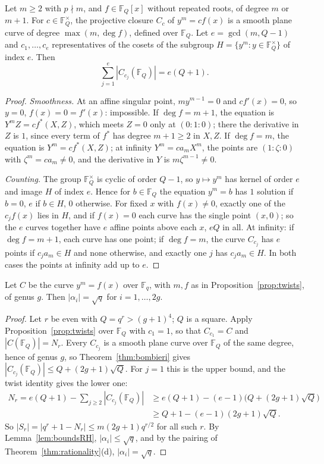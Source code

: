\begin{proposition}[twists]\label{prop:twists}
Let $m\ge2$ with $p\nmid m$, and $f\in\mathbb F_Q[x]$ without repeated roots, of degree $m$ or $m+1$. For $c\in\mathbb F_Q^\times$, the projective closure $C_c$ of
$y^m=cf(x)$ is a smooth plane curve of degree $\max(m,\deg f)$, defined over $\mathbb F_Q$. Let $e=\gcd(m,Q-1)$ and $c_1,\dots,c_e$ representatives of the cosets
of the subgroup $H=\{y^m:y\in\mathbb F_Q^\times\}$ of index $e$. Then
\[
\sum_{j=1}^e|C_{c_j}(\mathbb F_Q)|=e(Q+1).
\]
\end{proposition}
\begin{proof}
\emph{Smoothness.} At an affine singular point, $my^{m-1}=0$ and $cf'(x)=0$, so $y=0$, $f(x)=0=f'(x)$: impossible. If $\deg f=m+1$, the equation is
$Y^mZ=cf^*(X,Z)$, which meets $Z=0$ only at $(0:1:0)$; there the derivative in $Z$ is $1$, since every term of $f^*$ has degree $m+1\ge2$ in $X,Z$. If
$\deg f=m$, the equation is $Y^m=cf^*(X,Z)$; at infinity $Y^m=ca_mX^m$, the points are $(1:\zeta:0)$ with $\zeta^m=ca_m\ne0$, and the derivative in $Y$ is
$m\zeta^{m-1}\ne0$.

\emph{Counting.} The group $\mathbb F_Q^\times$ is cyclic of order $Q-1$, so $y\mapsto y^m$ has kernel of order $e$ and image $H$ of index $e$. Hence for
$b\in\mathbb F_Q$ the equation $y^m=b$ has $1$ solution if $b=0$, $e$ if $b\in H$, $0$ otherwise. For fixed $x$ with $f(x)\ne0$, exactly one of the $c_jf(x)$
lies in $H$, and if $f(x)=0$ each curve has the single point $(x,0)$; so the $e$ curves together have $e$ affine points above each $x$, $eQ$ in all. At infinity: if $\deg f=m+1$, each curve has one point; if $\deg f=m$,
the curve $C_{c_j}$ has $e$ points if $c_ja_m\in H$ and none otherwise, and exactly one $j$ has $c_ja_m\in H$. In both cases the points at infinity add up to $e$.
\end{proof}

\begin{theorem}[Riemann hypothesis for $y^m=f(x)$]\label{thm:rhfamily}
Let $C$ be the curve $y^m=f(x)$ over $\mathbb F_q$, with $m,f$ as in Proposition~\ref{prop:twists}, of genus $g$. Then $|\alpha_i|=\sqrt q$ for $i=1,\dots,2g$.
\end{theorem}
\begin{proof}
Let $r$ be even with $Q=q^r>(g+1)^4$; $Q$ is a square. Apply Proposition~\ref{prop:twists} over $\mathbb F_Q$ with $c_1=1$, so that $C_{c_1}=C$ and
$|C(\mathbb F_Q)|=N_r$. Every $C_{c_j}$ is a smooth plane curve over $\mathbb F_Q$ of the same degree, hence of genus $g$, so Theorem~\ref{thm:bombieri} gives
$|C_{c_j}(\mathbb F_Q)|\le Q+(2g+1)\sqrt Q$. For $j=1$ this is the upper bound, and the twist identity gives the lower one:
\[
\begin{aligned}
N_r=e(Q+1)-\sum_{j\ge2}|C_{c_j}(\mathbb F_Q)|&\ge e(Q+1)-(e-1)\bigl(Q+(2g+1)\sqrt Q\bigr)\\
&\ge Q+1-(e-1)(2g+1)\sqrt Q.
\end{aligned}
\]
So $|S_r|=|q^r+1-N_r|\le m(2g+1)q^{r/2}$ for all such $r$. By Lemma~\ref{lem:boundsRH}, $|\alpha_i|\le\sqrt q$, and by the pairing of
Theorem~\ref{thm:rationality}(d), $|\alpha_i|=\sqrt q$.
\end{proof}

